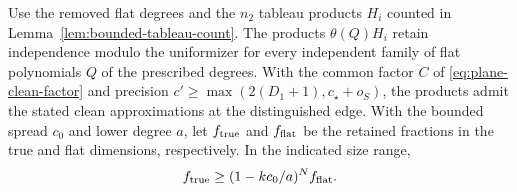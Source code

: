 \begin{proposition}\label{prop:restore-plane-model-rank}
Use the removed flat degrees and the \(n_2\) tableau products
\(H_i\) counted in Lemma~\ref{lem:bounded-tableau-count}. The products \(\theta(Q)H_i\) retain
independence modulo the uniformizer for every independent
family of flat polynomials \(Q\) of the prescribed degrees.
With the common factor \(C\) of \eqref{eq:plane-clean-factor}
and precision \(c'\ge\max(2(D_1+1),c_\star+o_S)\), the products
admit the stated clean approximations at the distinguished edge. With the bounded spread \(c_0\) and lower
degree \(a\), let \(f_{\rm true}\) and \(f_{\rm flat}\) be the retained fractions in the true and flat dimensions, respectively. In the indicated size range,
\[
 f_{\rm true}\ge(1-kc_0/a)^N f_{\rm flat}.
\]

\end{proposition}

